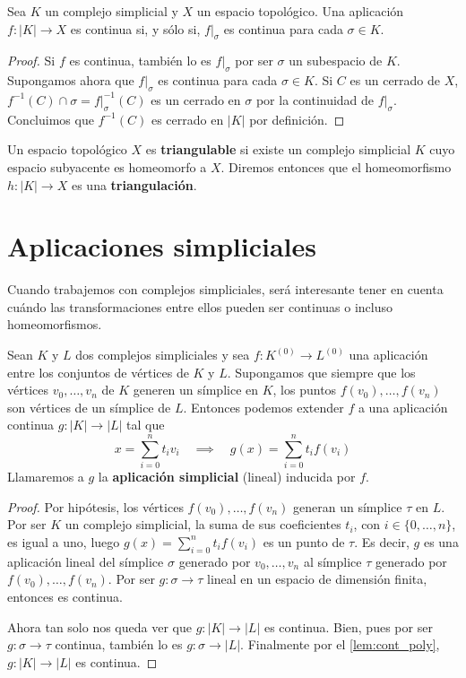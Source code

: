 \begin{lema}
	\label{lem:cont_poly} Sea $K$ un complejo simplicial y $X$ un espacio topológico.
	Una aplicación $f: |K| \rightarrow X$ es continua si, y sólo si, $f|_{\sigma}$
	es continua para cada $\sigma \in K$.
\end{lema}
\begin{proof}
	Si $f$ es continua, también lo es $f|_{\sigma}$ por ser $\sigma$ un subespacio
	de $K$. Supongamos ahora que $f|_{\sigma}$ es continua para cada $\sigma \in K$.
	Si $C$ es un cerrado de $X$, $f^{-1}(C) \cap \sigma = f|_{\sigma}^{-1}(C)$ es un
	cerrado en $\sigma$ por la continuidad de $f|_{\sigma}$. Concluimos que
	$f^{-1}(C)$ es cerrado en $|K|$ por definición.
\end{proof}
\begin{definicion}
	Un espacio topológico $X$ es \textbf{triangulable} si existe un complejo
	simplicial $K$ cuyo espacio subyacente es homeomorfo a $X$. Diremos entonces que
	el homeomorfismo $h: |K| \rightarrow X$ es una \textbf{triangulación}.
\end{definicion}

\section{Aplicaciones simpliciales}

Cuando trabajemos con complejos simpliciales, será interesante tener en cuenta
cuándo las transformaciones entre ellos pueden ser continuas o incluso
homeomorfismos.

\begin{lema}
	Sean $K$ y $L$ dos complejos simpliciales y sea $f: K^{(0)}\rightarrow L^{(0)}$
	una aplicación entre los conjuntos de vértices de $K$ y $L$. Supongamos que
	siempre que los vértices $v_{0}, \dots, v_{n}$ de $K$ generen un símplice en
	$K$, los puntos $f(v_{0}), \dots, f(v_{n})$ son vértices de un símplice de $L$.
	Entonces podemos extender $f$ a una aplicación continua
	$g:|K| \rightarrow |L|$ tal que
	\[
	x = \sum_{i=0}^{n}t_{i}v_{i} \quad \implies \quad g(x) = \sum_{i=0}^{n}t_{i}f
	(v_{i})
	\]
	Llamaremos a $g$ la \textbf{aplicación simplicial} (lineal) inducida por $f$.
\end{lema}

\begin{proof}
	Por hipótesis, los vértices $f(v_{0}), \dots, f(v_{n})$ generan un símplice
	$\tau$ en $L$. Por ser $K$ un complejo simplicial, la suma de sus coeficientes
	$t_{i}$, con $i \in \{0, \dots, n\}$, es igual a uno, luego $g(x) = \sum_{i=0}^{n}
	t_{i}f(v_{i})$ es un punto de $\tau$. Es decir, $g$ es una aplicación lineal del
	símplice $\sigma$ generado por $v_{0}, \dots, v_{n}$ al símplice $\tau$ generado
	por $f(v_{0}), \dots, f(v_{n})$. Por ser $g: \sigma \rightarrow \tau$ lineal
	en un espacio de dimensión finita, entonces es continua.
	
	Ahora tan solo nos queda ver que $g:|K| \rightarrow |L|$ es continua. Bien, pues
	por ser $g: \sigma \rightarrow \tau$ continua, también lo es
	$g: \sigma \rightarrow |L|$. Finalmente por el \autoref{lem:cont_poly},
	$g:|K| \rightarrow |L|$ es continua.
\end{proof}

